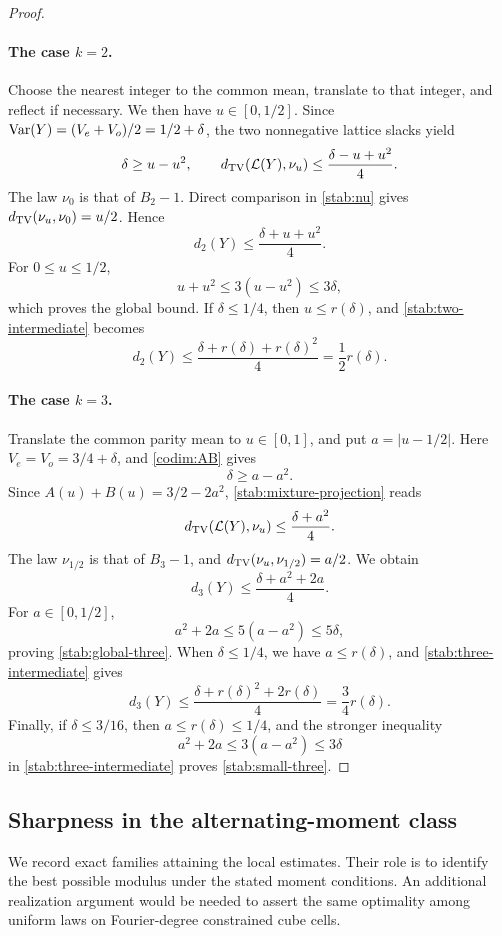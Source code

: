\begin{proof}
\paragraph{The case \(k=2\).}
Choose the nearest integer to the common mean, translate to that
integer, and reflect if necessary.  We then have \(u\in[0,1/2]\).
Since
\(\operatorname{Var}(Y)=(V_e+V_o)/2=1/2+\delta\), the two nonnegative
lattice slacks yield
\[
\delta\ge u-u^2,
\qquad
d_{\mathrm{TV}}(\mathcal L(Y),\nu_u)
\le\frac{\delta-u+u^2}{4}.
\]
The law \(\nu_0\) is that of \(B_2-1\).
Direct comparison in \eqref{stab:nu} gives
\(d_{\mathrm{TV}}(\nu_u,\nu_0)=u/2\).  Hence
\begin{equation}
\label{stab:two-intermediate}
d_2(Y)\le\frac{\delta+u+u^2}{4}.
\end{equation}
For \(0\le u\le1/2\),
\[
u+u^2\le3(u-u^2)\le3\delta,
\]
which proves the global bound.  If \(\delta\le1/4\),
then \(u\le r(\delta)\), and
\eqref{stab:two-intermediate} becomes
\[
d_2(Y)\le\frac{\delta+r(\delta)+r(\delta)^2}{4}
=\frac12r(\delta).
\]

\paragraph{The case \(k=3\).}
Translate the common parity mean to \(u\in[0,1]\), and put
\(a=|u-1/2|\).  Here
\(V_e=V_o=3/4+\delta\), and \eqref{codim:AB} gives
\[
\delta\ge a-a^2.
\]
Since \(A(u)+B(u)=3/2-2a^2\),
\eqref{stab:mixture-projection} reads
\[
d_{\mathrm{TV}}(\mathcal L(Y),\nu_u)\le\frac{\delta+a^2}{4}.
\]
The law \(\nu_{1/2}\) is that of \(B_3-1\), and
\(d_{\mathrm{TV}}(\nu_u,\nu_{1/2})=a/2\).  We obtain
\begin{equation}
\label{stab:three-intermediate}
d_3(Y)\le\frac{\delta+a^2+2a}{4}.
\end{equation}
For \(a\in[0,1/2]\),
\[
a^2+2a\le5(a-a^2)\le5\delta,
\]
proving \eqref{stab:global-three}.
When \(\delta\le1/4\), we have \(a\le r(\delta)\), and
\eqref{stab:three-intermediate} gives
\[
d_3(Y)\le
\frac{\delta+r(\delta)^2+2r(\delta)}4
=\frac34r(\delta).
\]
Finally, if \(\delta\le3/16\), then \(a\le r(\delta)\le1/4\),
and the stronger inequality
\[
a^2+2a\le3(a-a^2)\le3\delta
\]
in \eqref{stab:three-intermediate} proves
\eqref{stab:small-three}.
\end{proof}

\subsection{Sharpness in the alternating-moment class}

We record exact families attaining the local estimates.  Their role is
to identify the best possible modulus under the stated moment
conditions.  An additional realization argument would be needed to
assert the same optimality among uniform laws on Fourier-degree
constrained cube cells.

